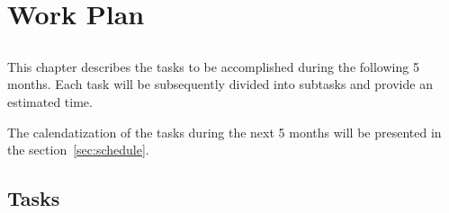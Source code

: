 \chapter{Work Plan} \label{chap:workplan}

\section*{}

This chapter describes the tasks to be accomplished during the
following 5 months. Each task will be subsequently divided into
subtasks and provide an estimated time.

The calendatization of the tasks during the next 5 months will
be presented in the section~\ref{sec:schedule}.

\section{Tasks} \label{sec:tasks}

